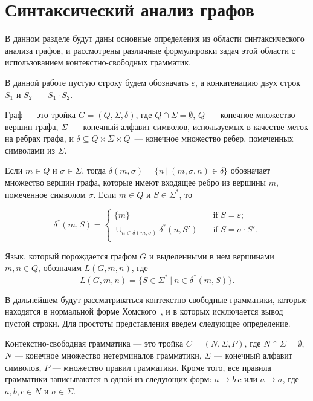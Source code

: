 \section{Синтаксический анализ графов}
В данном разделе будут даны основные определения из области синтаксического анализа графов, и рассмотрены различные формулировки задач этой области с использованием контекстно-свободных грамматик.

В данной работе пустую строку будем обозначать $\varepsilon$, а конкатенацию двух строк $S_{1}$ и $S_{2}$~--- $S_{1} \cdot S_{2}$.

\begin{mydef}
Граф --- это тройка $G = (Q,\Sigma,\delta)$, где $Q \cap \Sigma =  \emptyset$, $Q$~--- конечное множество вершин графа, $\Sigma$~--- конечный алфавит символов, используемых в качестве меток на ребрах графа, и $\delta \subseteq Q \times \Sigma \times Q$~--- конечное множество ребер, помеченных символами из $\Sigma$.
\end{mydef}
Если $m \in Q$ и $\sigma \in \Sigma$, тогда $\delta(m,\sigma) = \{n~|~(m, \sigma, n) \in \delta\}$ обозначает множество вершин графа, которые имеют входящее ребро из вершины $m$, помеченное символом $\sigma$. Если $m \in Q$ и $S \in \Sigma^*$, то


\[ \delta^*(m, S) =
  \begin{cases}
    \{m\}       & \quad \text{if } S = \varepsilon ;\\
    \cup_{n \in \delta(m, \sigma)} \delta^*(n, S')  & \quad \text{if } S = \sigma \cdot S'.\\
  \end{cases}
\]

Язык, который порождается графом $G$ и выделенными в нем вершинами $m, n \in Q$, обозначим $L(G, m, n)$, где
\[ L(G, m, n) = \{S \in \Sigma^*~|~n \in \delta^*(m, S)\}.
\]

В дальнейшем будут рассматриваться контекстно-свободные грамматики, которые находятся в нормальной форме Хомского~\cite{azimov-spbu-binChomsk}, и в которых исключается вывод пустой строки. Для простоты представления введем следующее определение.

\begin{mydef}
Контекстно-свободная грамматика --- это тройка $C = (N,\Sigma,P)$, где $N \cap \Sigma =  \emptyset$, $N$ --- конечное множество нетерминалов грамматики, $\Sigma$ --- конечный алфавит символов, $P$ --- множество правил грамматики. Кроме того, все правила грамматики записываются в одной из следующих форм: $a \rightarrow b~c$ или $a \rightarrow \sigma$, где $a,b,c \in N$ и $\sigma \in \Sigma$.
\end{mydef}

